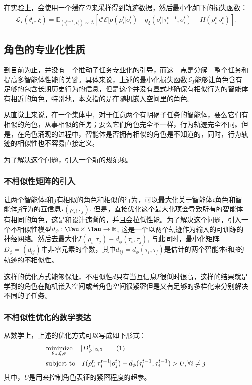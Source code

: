 在实验上，会使用一个缓存$\mathcal{D}$来采样得到轨迹数据，然后最小化如下的损失函数：
\begin{equation}
    \begin{aligned}
        \mathcal{L}_I(\theta_\rho, \xi) = \mathbb{E}_{(\tau^{t-1}_i, o^t_i)\sim\mathcal{D}}\left[\mathcal{CE}[p(\rho^t_i | o^t_i) \| q_\xi(\rho^t_i | \tau^{t-1}_i, o^t_i) - H(\rho_i^t | o_i^t)\right].
    \end{aligned}
\end{equation}

\subsection{角色的专业化性质}
到目前为止，并没有一个推动子任务专业化的引导，而这一点是分解一整个任务和提高多智能体性能的关键。具体来说，上述的最小化损失函数$\mathcal{L}_I$能够让角色含有足够的包含长期历史行为的信息，但是这个并没有显式地确保有相似行为的智能体有相近的角色，特别地，本文指的是在随机嵌入空间里的角色。

从直觉上来说，在一个集体中，对于任意两个有明确子任务的智能体，要么它们有相似的角色，从事相似的任务；要么它们角色完全不一样，行为轨迹完全不同。但是，在角色涌现的过程中，智能体是否拥有相似的角色是不知道的，同时，行为轨迹的相似性也不容易直接定义。

为了解决这个问题，引入一个新的规范项。

\subsubsection{不相似性矩阵的引入}
让两个智能体$i$和$j$有相似的角色和相似的行为，可以最大化关于智能体$i$角色和智能体$j$行为的互信息$I(\rho_i; \tau_j)$. 但是，直接优化这个最大化项会导致所有的智能体有相同的角色，这是和设计违背的，并且会拉低性能。为了解决这个问题，引入一个不相似性模型$d_{\phi}: \Tau\times\Tau\rightarrow\mathbb{R}$, 这是一个以两个轨迹作为输入的可训练的神经网络。然后去最大化$I(\rho_i; \tau_j) + d_\phi(\tau_i, \tau_j)$, 与此同时，最小化矩阵$D_\phi=(d_{ij})$中非零元素的个数，其中$d_{ij}=d_\phi(\tau_i, \tau_j)$是估计的两个智能体$i$和$j$的轨迹的不相似性。

这样的优化方式能够保证，不相似性$d$只有当互信息$I$很低时很高，这样的结果就是学到的角色在随机嵌入空间或者角色空间很紧密但是又有足够的多样化来分别解决不同的子任务。

\subsubsection{不相似性优化的数学表达}
从数学上，上述的优化方式可以写成如下形式：
\begin{align*}
    &\underset{{\theta_\rho, \xi, \phi}}{\text{minimize}} \ \ \ \|D_\phi^t\|_{2,0} \stepcounter{equation}\tag{\theequation} \\
    &\text{subject to} \ \ \ I(\rho^{t}_i; \tau^{t-1}_j|o^t_j) + d_\phi(\tau^{t-1}_i, \tau^{t-1}_j) > U, \forall i\ne j
\end{align*}
其中，$U$是用来控制角色表征的紧密程度的超参。

